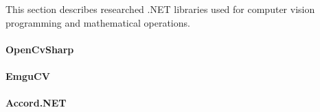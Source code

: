 \documentclass[../../../../main]{subfiles}
\begin{document}
This section describes researched .NET libraries used for computer vision programming and mathematical operations.

\paragraph{OpenCvSharp}

\newpage

\paragraph{EmguCV}

\newpage

\paragraph{Accord.NET}

\newpage
\end{document}
